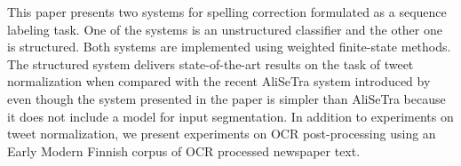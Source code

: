 This paper presents two systems for spelling correction formulated as a sequence labeling task. One of the systems is an unstructured classifier and the other one is structured. Both systems are implemented using weighted finite-state methods. The structured system delivers state-of-the-art results on the task of tweet normalization when compared with the recent AliSeTra system introduced by  even though the system presented in the paper is simpler than AliSeTra because it does not include a model for input segmentation. In addition to experiments on tweet normalization, we present experiments on OCR post-processing using an Early Modern Finnish corpus of OCR processed newspaper text.
